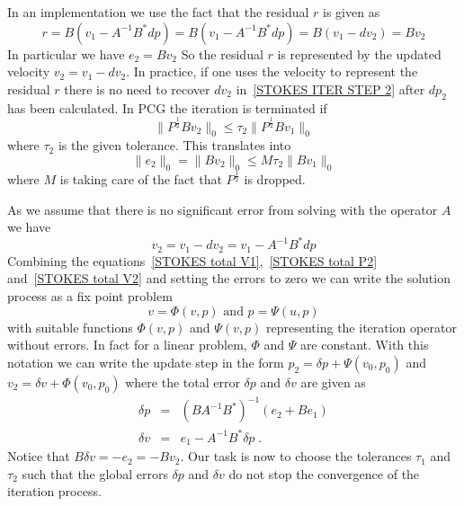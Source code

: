 In an implementation we use the fact that the residual $r$ is given as
\begin{equation} \label{STOKES RES }
 r= B (v_{1} -  A^{-1} B^{*} dp) =  B (v_{1} - A^{-1} B^{*} dp) = B (v_{1}-dv_{2}) = B v_{2}
\end{equation}
In particular we have $e_{2} = B v_{2}$
So the residual $r$ is represented by the updated velocity $v_{2}=v_{1}-dv_{2}$. In practice, if
one uses the velocity to represent the residual $r$ there is no need 
to recover $dv_{2}$ in~\ref{STOKES ITER STEP 2} after $dp_{2}$ has been calculated.
In PCG the iteration is terminated if
\begin{equation} \label{STOKES P OPERATOR ERROR}
\| P^{\frac{1}{2}}B v_{2} \|_{0} \le \tau_{2} \| P^{\frac{1}{2}}B v_{1} \|_{0}
\end{equation}
where $\tau_{2}$ is the given tolerance. This translates into
\begin{equation} \label{STOKES P OPERATOR ERROR 2}
\|e_{2}\|_{0} = \| B v_{2} \|_{0} \le M \tau_{2} \| B v_{1} \|_{0}
\end{equation}
where $M$ is taking care of the fact that $P^{\frac{1}{2}}$ is dropped.   

As we assume that there is no significant error from solving with the operator $A$ we have 
\begin{equation} \label{STOKES total V2}
v_{2} =  v_{1} - dv_{2} 
= v_{1}  - A^{-1} B^{*}dp 
\end{equation}
Combining the equations~\ref{STOKES total V1},~\ref{STOKES total P2} and~\ref{STOKES total V2} and
setting the errors to zero we can write the solution process as a fix point problem 
\begin{equation} 
v = \Phi(v,p) \mbox{ and } p = \Psi(u,p) 
\end{equation}
with suitable functions $\Phi(v,p)$ and $ \Psi(v,p)$ representing the iteration operator without 
errors. In fact for a linear problem,  $\Phi$ and $\Psi$ are constant. With this notation we can write
the update step in the form $p_{2}= \delta p + \Psi(v_{0},p_{0})$ and 
$v_{2}= \delta v + \Phi(v_{0},p_{0})$ where 
the total error $\delta p$ and $\delta v$ are given as
\begin{equation} 
 \begin{array}{rcl}
\delta p & = &  (B A^{-1} B^{*})^{-1} ( e_{2} + B e_{1} ) \\
\delta v & = &  e_{1} -  A^{-1} B^{*}\delta p  \;.
\end{array}\label{STOKES ERRORS}
\end{equation}
Notice that $B\delta v = - e_{2}=-Bv_{2}$. Our task is now to choose the tolerances
$\tau_{1}$ and $\tau_{2}$ such that the global errors $\delta p$ and $\delta v$
do not stop the convergence of the iteration process. 

